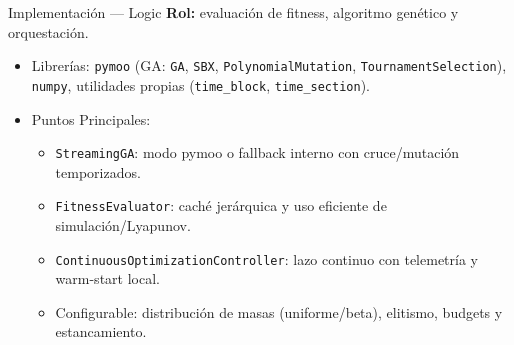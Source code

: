 \begin{frame}{Implementación — Logic}
    \textbf{Rol:} evaluación de fitness, algoritmo genético y orquestación.
    \vspace{0.2cm}
    \begin{itemize}
        \item Librerías: \texttt{pymoo} (GA: \texttt{GA}, \texttt{SBX}, \texttt{PolynomialMutation}, \texttt{TournamentSelection}), \texttt{numpy}, utilidades propias (\texttt{time\_block}, \texttt{time\_section}).
        \item Puntos Principales:
        \begin{itemize}
            \item \texttt{StreamingGA}: modo pymoo o fallback interno con cruce/mutación temporizados.
            \item \texttt{FitnessEvaluator}: caché jerárquica y uso eficiente de simulación/Lyapunov.
            \item \texttt{ContinuousOptimizationController}: lazo continuo con telemetría y warm-start local.
            \item Configurable: distribución de masas (uniforme/beta), elitismo, budgets y estancamiento.
        \end{itemize}
    \end{itemize}
\end{frame}

